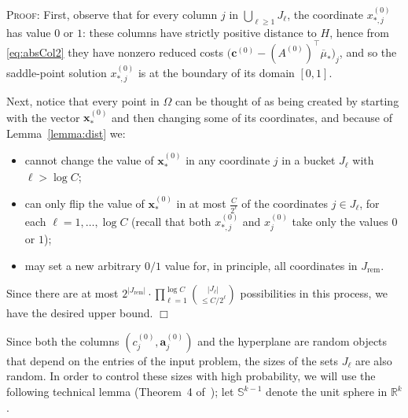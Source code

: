 \documentclass{article}
\newcommand{\R}{\mathbb{R}}
\newcommand{\av}[0]{\mathbf{a}}
\newcommand{\cv}[0]{\mathbf{c}}
\newcommand{\xv}[0]{\mathbf{x}}
\newenvironment{proof}[1][]
   {\textsc{Proof#1: }}
   {\hfill$\Box$\smallskip}
\begin{document}
\begin{proof}
    First, observe that for every column $j$ in $\bigcup_{\ell \ge 1} J_\ell$, the coordinate $x^{(0)}_{*,j}$ has value $0$ or $1$: these columns have strictly positive distance to $H$, hence from \eqref{eq:absCol2} they have nonzero reduced costs $\big(\cv^{(0)} - (A^{(0)})^{\top} \overline{\mu}_*\big)_j$, and so the saddle-point solution $x^{(0)}_{*,j}$ is at the boundary of its domain $[0,1]$.

    Next, notice that every point in $\Omega$ can be thought of as being created by starting with the vector $\xv^{(0)}_*$ and then changing some of its coordinates, and because of Lemma~\ref{lemma:dist} we:
\begin{itemize}
    \item cannot change the value of $\xv^{(0)}_*$ in any coordinate $j$ in a bucket $J_\ell$ with $\ell > \log C$;
    \item can only flip the value of $\xv^{(0)}_*$ in at most $\frac{C}{2^\ell}$ of the coordinates $j \in J_\ell$, for each $\ell = 1, \dots, \log C$ (recall that both $x^{(0)}_{*,j}$ and $x^{(0)}_j$ take only the values $0$ or $1$);
    \item may set a new arbitrary $0/1$ value for, in principle, all coordinates in $J_{\mathrm{rem}}$.
\end{itemize}

Since there are at most $2^{|J_{\mathrm{rem}}|} \cdot \prod_{\ell=1}^{\log C} \binom{|J_\ell|}{\leq C/2^\ell}$ possibilities in this process, we have the desired upper bound.
\end{proof}

Since both the columns $(c^{(0)}_j, \av^{(0)}_j)$ and the hyperplane are random objects that depend on the entries of the input problem, the sizes of the sets $J_\ell$ are also random. In order to control these sizes with high probability, we will use the following technical lemma (Theorem~4 of~\cite{dey2021branch}); let $\mathbb{S}^{k-1}$ denote the unit sphere in $\R^k$.
\end{document}
